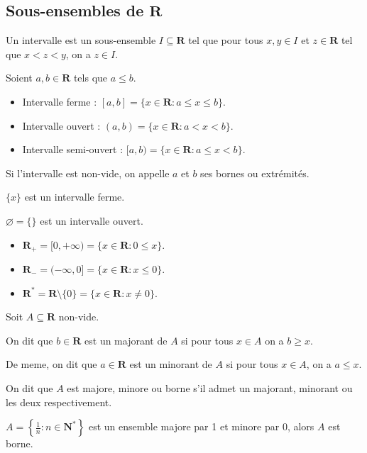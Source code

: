 \subsection{Sous-ensembles de \texorpdfstring{$\mathbf{R}$}{R}}
\begin{definition}
Un intervalle est un sous-ensemble $I\subseteq \mathbf{R}$ tel que pour tous $x,y\in I$ et $z\in \mathbf{R}$ tel que $x<z<y$, on a $z\in I$.
\end{definition}
\begin{definition}
Soient $a,b\in \mathbf{R}$ tels que $a\le b$.
\begin{itemize}
\item Intervalle ferme : $[a,b]=\{ x \in \mathbf{R}:a\le x\le b \}$.
\item Intervalle ouvert : $(a,b)=\{x \in \mathbf{R}:a<x<b \}$.
\item Intervalle semi-ouvert : $[a,b)=\{x \in \mathbf{R}:a\le x <b \}$.
\end{itemize}
Si l'intervalle est non-vide, on appelle $a$ et $b$ ses bornes ou extrémités.
\end{definition}
\begin{example}
$\{ x \}$ est un intervalle ferme. 
\end{example}
\begin{example}
$\varnothing=\{  \}$ est un intervalle ouvert.
\end{example}
\begin{notation}
\begin{itemize}
\item $\mathbf{R}_{+}=[0,+\infty)=\{  x \in \mathbf{R}:0\le x \}$.
\item $\mathbf{R}_{-}=(-\infty,0]=\{ x\in \mathbf{R}:x\le 0 \}$.
\item $\mathbf{R}^{*}=\mathbf{R}\setminus \{ 0 \}=\{ x\in \mathbf{R}:x\neq0 \}$.
\end{itemize}
\end{notation}
Soit $A\subseteq \mathbf{R}$ non-vide.
\begin{definition}
On dit que $b\in \mathbf{R}$ est un majorant de $A$ si pour tous $x \in A$ on a $b\ge x$.

De meme, on dit que $a\in \mathbf{R}$ est un minorant de $A$ si pour tous $x \in A$, on a $a\le x$.
\end{definition}
\begin{definition}
On dit que $A$ est majore, minore ou borne s'il admet un majorant, minorant ou les deux respectivement.
\end{definition}
\begin{example}
$A=\left\{  \frac{1}{n}:n\in \mathbf{N}^{*}  \right\}$ est un ensemble majore par 1 et minore par 0, alors $A$ est borne.
\end{example}

